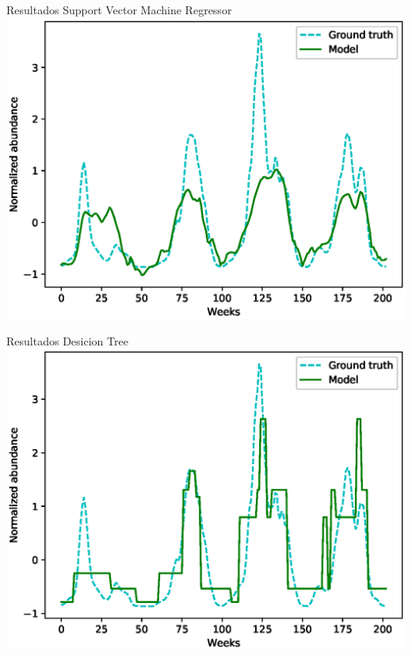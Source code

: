 \documentclass[10pt]{beamer}
\begin{document}
\begin{frame}{Resultados}
  \centering
  Support Vector Machine Regressor
  \includegraphics[width=\textwidth]{svr.eps}
\end{frame}

\begin{frame}{Resultados}
  \centering
  Desicion Tree
  \includegraphics[width=\textwidth]{dtr.eps}
\end{frame}
\end{document}
